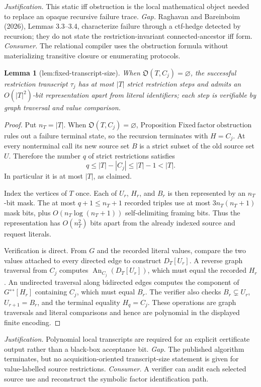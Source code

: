 \documentclass{article}
\newtheorem{lemma}{Lemma}
\begin{document}
\par\smallskip\noindent \textit{Justification.} This static iff obstruction is the local mathematical object needed to replace an opaque recursive failure trace. \textit{Gap.} Raghavan and Bareinboim (2026), Lemmas 3.3--3.4, characterize failure through a ctf-hedge detected by recursion; they do not state the restriction-invariant connected-ancestor iff form. \textit{Consumer.} The relational compiler uses the obstruction formula without materializing transitive closure or enumerating protocols.

\begin{lemma}[lem:fixed-transcript-size]\label{lem:fixed-transcript-size}
When \(\mathfrak O(T,C_j)=\varnothing\), the successful restriction transcript \(\tau_j\) has at most \(|T|\) strict restriction steps and admits an \(O(|T|^2)\)-bit representation apart from literal identifiers; each step is verifiable by graph traversal and value comparison.
\end{lemma}
\begin{proof}
Put \(n_T=|T|\).  When \(\mathfrak O(T,C_j)=\varnothing\), Proposition \(\mathrm{Fixed\ factor\ obstruction}\) rules out a failure terminal state, so the recursion terminates with \(H=C_j\).  At every nonterminal call its new source set \(B\) is a strict subset of the old source set \(U\).  Therefore the number \(q\) of strict restrictions satisfies
\[
 q\le |T|-|C_j|\le |T|-1<|T|.
\]
In particular it is at most \(|T|\), as claimed.

Index the vertices of \(T\) once.  Each of \(U_r\), \(H_r\), and \(B_r\) is then represented by an \(n_T\)-bit mask.  The at most \(q+1\le n_T+1\) recorded triples use at most \(3n_T(n_T+1)\) mask bits, plus \(O(n_T\log(n_T+1))\) self-delimiting framing bits.  Thus the representation has \(O(n_T^2)\) bits apart from the already indexed source and request literals.

Verification is direct.  From \(G\) and the recorded literal values, compare the two values attached to every directed edge to construct \(D_T[U_r]\).  A reverse graph traversal from \(C_j\) computes \(\operatorname{An}_{C_j}(D_T[U_r])\), which must equal the recorded \(H_r\).  An undirected traversal along bidirected edges computes the component of \(G^{\leftrightarrow}[H_r]\) containing \(C_j\), which must equal \(B_r\).  The verifier also checks \(B_r\subsetneq U_r\), \(U_{r+1}=B_r\), and the terminal equality \(H_q=C_j\).  These operations are graph traversals and literal comparisons and hence are polynomial in the displayed finite encoding.
\end{proof}
\par\smallskip\noindent \textit{Justification.} Polynomial local transcripts are required for an explicit certificate output rather than a black-box acceptance bit. \textit{Gap.} The published algorithm terminates, but no acquisition-oriented transcript-size statement is given for value-labelled source restrictions. \textit{Consumer.} A verifier can audit each selected source use and reconstruct the symbolic factor identification path.
\end{document}
